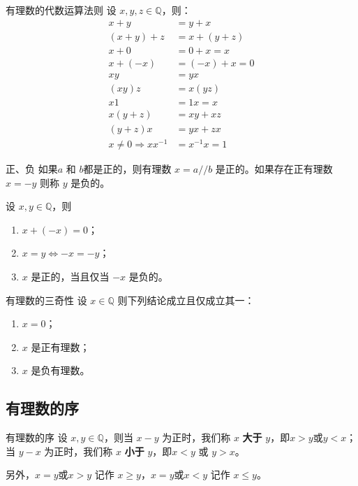 \begin{theorem}{有理数的代数运算法则}{}
	设 $x,y,z\in \mathbb Q$，则：
$$
\begin{aligned}
	x+y&=y+x\\
	(x+y)+z & = x+(y+z)\\
	x+0 & = 0+x=x\\
	x + (-x)& = (-x) + x = 0\\
	xy&=yx\\
	(xy)z & = x(yz)\\
	x1&=1x=x\\
	x(y+z) & = xy+xz\\
	(y+z)x & = yx+zx\\
	x\ne 0 \Rightarrow xx^{-1} &= x^{-1} x=1
\end{aligned}
$$

\end{theorem}

\begin{definition}{正、负}{}
	如果$a$ 和 $b$都是正的，则有理数 $x=a//b$ 是正的。如果存在正有理数 $x=-y$ 则称 $y$ 是负的。
\end{definition}

\begin{lemma}{}{}
	设 $x,y\in \mathbb Q$，则
	\begin{enumerate}
		\item $x+(-x) = 0$；
		\item $x=y\iff -x=-y$；
		\item $x$ 是正的，当且仅当 $-x$ 是负的。
	\end{enumerate}
\end{lemma}

\begin{theorem}{有理数的三奇性}{}
	设 $x\in \mathbb Q$ 则下列结论成立且仅成立其一：
	
	\begin{enumerate}
		\item $x=0$；
		\item $x$ 是正有理数；
		\item $x$ 是负有理数。
	\end{enumerate}
\end{theorem}

\subsection{有理数的序}

\begin{definition}{有理数的序}{}
	设 $x,y\in \mathbb Q$，则当 $x-y$ 为正时，我们称 $x$ \textbf{大于} $y$，即$x>y$或$y<x$；当 $y-x$ 为正时，我们称 $x$ \textbf{小于} $y$，即$x<y$ 或 $y>x$。
	
	\noindent 另外，$x=y$或$x>y$ 记作 $x\ge y$，$x=y$或$x<y$ 记作 $x\le y$。
\end{definition}

